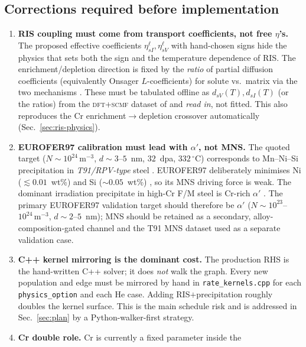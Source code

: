 \documentclass[11pt]{article}
\newcommand{\code}[1]{\texttt{#1}}
\begin{document}
\subsection{Corrections required before implementation}
\label{sec:corrections}
\begin{enumerate}[leftmargin=1.6em]
\item \textbf{RIS coupling must come from transport coefficients, not free
$\eta$'s.} The proposed effective coefficients $\eta_{sI}^{\ell},
\eta_{sV}^{\ell}$ with hand-chosen signs hide the physics that sets both the
sign and the temperature dependence of RIS. The enrichment/depletion direction
is fixed by the \emph{ratio} of partial diffusion coefficients (equivalently
Onsager $L$-coefficients) for solute vs.\ matrix via the two mechanisms
\citep{WiedersichOkamotoLam1979,AllenWas1998,Messina2020,Oplinger2026}. These
must be tabulated offline as $d_{sV}(T),d_{sI}(T)$ (or the ratios) from the
\textsc{dft}{}+\textsc{scmf} dataset of \citet{Messina2014,Messina2020} and
\emph{read in}, not fitted. This also reproduces the Cr enrichment$\to$depletion
crossover automatically (Sec.~\ref{sec:ris-physics}).
\item \textbf{EUROFER97 calibration must lead with $\alpha'$, not MNS.} The
quoted target ($N\!\sim\!10^{24}\,\mathrm{m^{-3}}$, $d\!\sim\!3$--$5$~nm,
$32$~dpa, $332\,^\circ$C) corresponds to Mn--Ni--Si precipitation in
\emph{T91/RPV-type} steel \citep{Ke2018fm}. EUROFER97 deliberately minimises
Ni ($\lesssim0.01$~wt\%) and Si ($\sim0.05$~wt\%) \citep{Lindau2002}, so its
MNS driving force is weak. The dominant irradiation precipitate in high-Cr F/M
steel is Cr-rich $\alpha'$ \citep{Mathon2003,Bachhav2014,Reese2018}. The
primary EUROFER97 validation target should therefore be $\alpha'$
($N\!\sim\!10^{23}$--$10^{24}\,\mathrm{m^{-3}}$, $d\!\sim\!2$--$5$~nm); MNS
should be retained as a secondary, alloy-composition-gated channel and the
T91 MNS dataset used as a separate validation case.
\item \textbf{C++ kernel mirroring is the dominant cost.} The production RHS is
the hand-written C++ solver; it does \emph{not} walk the graph. Every new
population and edge must be mirrored by hand in
\code{rate\_kernels.cpp} for each \code{physics\_option} and each He case.
Adding RIS$+$precipitation roughly doubles the kernel surface. This is the main
schedule risk and is addressed in Sec.~\ref{sec:plan} by a Python-walker-first
strategy.
\item \textbf{Cr double role.} Cr is currently a fixed parameter inside the

\end{enumerate}
\end{document}
